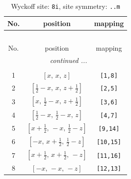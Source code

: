 \documentclass[fleqn,8pt]{jsarticle}
\begin{document}
\begin{longtable}{ccc}
\caption{Wyckoff site: {\tt 8i}, site symmetry: {\tt ..m}}
 \\
 \hline \hline
No. & position & mapping \\ \hline \endfirsthead

\multicolumn{2}{l}{\tablename\ \thetable{}} \\
 \hline \hline
No. & position & mapping \\ \hline \endhead

 \hline \hline
\multicolumn{2}{r}{\footnotesize\it continued ...} \\ \endfoot

 \hline \hline
\multicolumn{2}{r}{} \\ \endlastfoot

1 & $\left[ x,\, x,\, z \right]$ & {\tt [1,8]} \\ \hline
2 & $\left[ \frac{1}{2} - x,\, x,\, z + \frac{1}{2} \right]$ & {\tt [2,5]} \\ \hline
3 & $\left[ x,\, \frac{1}{2} - x,\, z + \frac{1}{2} \right]$ & {\tt [3,6]} \\ \hline
4 & $\left[ \frac{1}{2} - x,\, \frac{1}{2} - x,\, z \right]$ & {\tt [4,7]} \\ \hline
5 & $\left[ x + \frac{1}{2},\, - x,\, \frac{1}{2} - z \right]$ & {\tt [9,14]} \\ \hline
6 & $\left[ - x,\, x + \frac{1}{2},\, \frac{1}{2} - z \right]$ & {\tt [10,15]} \\ \hline
7 & $\left[ x + \frac{1}{2},\, x + \frac{1}{2},\, - z \right]$ & {\tt [11,16]} \\ \hline
8 & $\left[ - x,\, - x,\, - z \right]$ & {\tt [12,13]} \\
\end{longtable}
\renewcommand{\arraystretch}{1.2}
\end{document}
